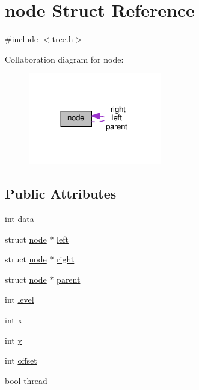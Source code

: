 \hypertarget{structnode}{}\section{node Struct Reference}
\label{structnode}


{\ttfamily \#include $<$tree.\+h$>$}



Collaboration diagram for node\+:
\nopagebreak
\begin{figure}[H]
\begin{center}
\leavevmode
\includegraphics[width=164pt]{structnode__coll__graph}
\end{center}
\end{figure}
\subsection*{Public Attributes}
\begin{DoxyCompactItemize}
\item 
int \hyperlink{structnode_a2d890bb9f6af0ffd73fe79b21124c2a2}{data}
\item 
struct \hyperlink{structnode}{node} $\ast$ \hyperlink{structnode_a3ce38490a651bfda86d88ff955e96abc}{left}
\item 
struct \hyperlink{structnode}{node} $\ast$ \hyperlink{structnode_a875f75abfe22103500535b179828e4e3}{right}
\item 
struct \hyperlink{structnode}{node} $\ast$ \hyperlink{structnode_a05e4fe9e0177ba2d8dbd2c487cfddd53}{parent}
\item 
int \hyperlink{structnode_a3871d43e823ba9542b052912d01709dd}{level}
\item 
int \hyperlink{structnode_a64dd8b65a7d38c632a017d7f36444dbb}{x}
\item 
int \hyperlink{structnode_ae944a3a75efb9856fa5c6f2221e2b49e}{y}
\item 
int \hyperlink{structnode_aeef7855fea382bfb671d7834aefa4b22}{offset}
\item 
bool \hyperlink{structnode_afd9ff5fa3c3ab99d07cac2a7ad9d14a6}{thread}
\end{DoxyCompactItemize}


